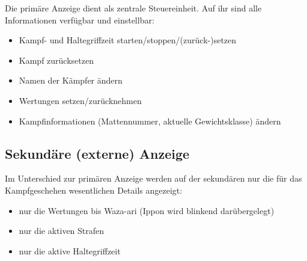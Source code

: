 ﻿\documentclass[11pt,numbers=noenddot]{scrreprt}
\begin{document}
Die primäre Anzeige dient als zentrale Steuereinheit. Auf ihr sind alle Informationen verfügbar und einstellbar:
\begin{itemize}
	\item Kampf- und Haltegriffzeit starten/stoppen/(zurück-)setzen
	\item Kampf zurücksetzen
	\item Namen der Kämpfer ändern
	\item Wertungen setzen/zurücknehmen
	\item Kampfinformationen (Mattennummer, aktuelle Gewichtsklasse) ändern
\end{itemize}

\subsection{Sekundäre (externe) Anzeige}
Im Unterschied zur primären Anzeige werden auf der sekundären nur die für das Kampfgeschehen wesentlichen Details angezeigt:

\begin{itemize}
	\item nur die Wertungen bis Waza-ari (Ippon wird blinkend darübergelegt)
	\item nur die aktiven Strafen
	\item nur die aktive Haltegriffzeit
\end{itemize}
\end{document}
